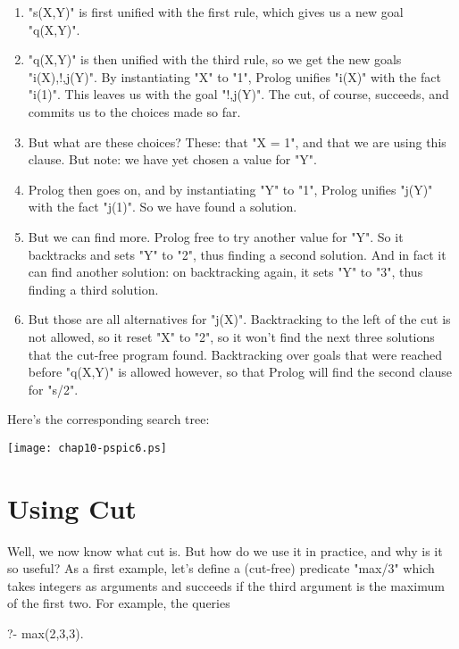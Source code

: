 \begin{enumerate}

\item{}"s(X,Y)" is first unified with the first rule, which gives us a
new goal "q(X,Y)".

\item{}"q(X,Y)" is then unified with the third rule, so we get the new
goals "i(X),!,j(Y)".  By instantiating "X" to "1", Prolog unifies
"i(X)" with the fact "i(1)". This leaves us with the goal
"!,j(Y)". The cut, of course, succeeds, and commits us to the choices
made so far.

\item{}But what are these choices?  These: that "X = 1", and that
we are using this clause.  But note: we have  yet chosen a
value for "Y".

\item{}Prolog then goes on, and by instantiating "Y" to "1",
Prolog unifies "j(Y)" with the fact "j(1)".  So we have
found a solution.

\item{}But we can find more.  Prolog  free to try another value
for "Y". So it backtracks and sets "Y" to "2", thus
finding a second solution.  And in fact it can find another solution:
on backtracking again, it sets "Y" to "3", thus finding a
third solution.

\item{}But those are all alternatives for "j(X)". Backtracking to
the left of the cut is not allowed, so it  reset "X" to
"2", so it won't find the next three solutions that the cut-free
program found. Backtracking over goals that were reached before
"q(X,Y)" is allowed however, so that Prolog will find the second
clause for "s/2".
\end{enumerate}

Here's the corresponding search tree:

\begin{center}
\texttt{[image: chap10-pspic6.ps]}
\end{center}

\section{Using Cut}\label{SEC.L10.USING.CUT}

Well, we now know what cut is.  But how do we use it in practice, and
why is it so useful?  As a first example, let's define a (cut-free)
predicate "max/3" which takes integers as arguments
and succeeds if the third argument is the maximum of the first two.
For example, the queries
\begin{LPNcodedisplay}
?- max(2,3,3).
\end{LPNcodedisplay}

